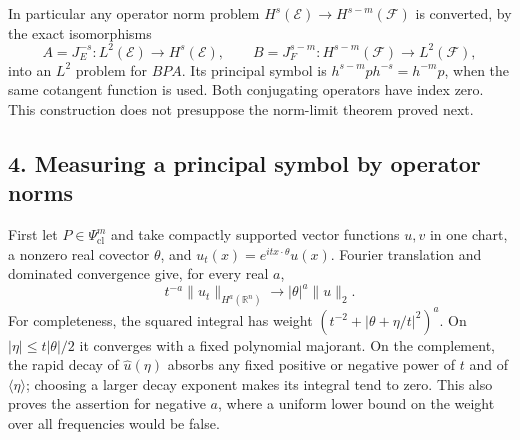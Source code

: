 \documentclass[
  11pt,
]{article}
\makeatletter
\let\ReaderOriginalAnchorStart\hyper@anchorstart
\let\ReaderOriginalAnchorEnd\hyper@anchorend
\let\ReaderPendingAliases\@empty
\def\ReaderArmAliases#1{\gdef\ReaderPendingAliases{#1}}
\def\hyper@anchorstart#1{\ReaderIfNativeAnchorTF{#1}{\ReaderPendingAliases\global\let\ReaderPendingAliases\@empty}{}\ReaderOriginalAnchorStart{#1}}
\makeatother
\begin{document}
In particular any operator norm problem
\(H^s(\mathcal E)\to H^{s-m}(\mathcal F)\) is converted, by the exact
isomorphisms \[
A=J_E^{-s}:L^2(\mathcal E)\to H^s(\mathcal E),
\qquad
B=J_F^{s-m}:H^{s-m}(\mathcal F)\to L^2(\mathcal F),
\tag{I10}
\] into an \(L^2\) problem for \(BPA\). Its principal symbol is
\(h^{s-m}ph^{-s}=h^{-m}p\), when the same cotangent function is used.
Both conjugating operators have index zero. This construction does not
presuppose the norm-limit theorem proved next.

\ReaderArmAliases{\ReaderOriginalAnchorStart{AN03-GSI-004}\ReaderOriginalAnchorEnd\begingroup\expandafter\def\csname @currentHref\endcsname{AN03-GSI-004}\label{AN03-GSI-004}\endgroup\ReaderOriginalAnchorStart{an03-gsi-004-measuring-a-principal-symbol-by-operator-norms}\ReaderOriginalAnchorEnd\begingroup\expandafter\def\csname @currentHref\endcsname{an03-gsi-004-measuring-a-principal-symbol-by-operator-norms}\label{an03-gsi-004-measuring-a-principal-symbol-by-operator-norms}\endgroup\ReaderOriginalAnchorStart{4-measuring-a-principal-symbol-by-operator-norms}\ReaderOriginalAnchorEnd\begingroup\expandafter\def\csname @currentHref\endcsname{4-measuring-a-principal-symbol-by-operator-norms}\label{4-measuring-a-principal-symbol-by-operator-norms}\endgroup}
\subsection{4. Measuring a principal symbol by operator
norms}\label{measuring-a-principal-symbol-by-operator-norms}

First let \(P\in\Psi^m_{\mathrm{cl}}\) and take compactly supported
vector functions \(u,v\) in one chart, a nonzero real covector
\(\theta\), and \(u_t(x)=e^{itx\cdot\theta}u(x)\). Fourier translation
and dominated convergence give, for every real \(a\), \[
t^{-a}\|u_t\|_{H^a(\mathbb R^n)}\longrightarrow |\theta|^a\|u\|_2.
\tag{I11}
\] For completeness, the squared integral has weight
\((t^{-2}+|\theta+\eta/t|^2)^a\). On \(|\eta|\leq t|\theta|/2\) it
converges with a fixed polynomial majorant. On the complement, the rapid
decay of \(\widehat u(\eta)\) absorbs any fixed positive or negative
power of \(t\) and of \(\langle\eta\rangle\); choosing a larger decay
exponent makes its integral tend to zero. This also proves the assertion
for negative \(a\), where a uniform lower bound on the weight over all
frequencies would be false.
\end{document}
